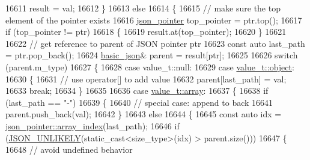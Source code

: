 \begin{DoxyCode}
16611                 result = val;
16612             \}
16613             \textcolor{keywordflow}{else}
16614             \{
16615                 \textcolor{comment}{// make sure the top element of the pointer exists}
16616                 \hyperlink{classnlohmann_1_1basic__json_a6886a5001f5b449ad316101a311ce536}{json\_pointer} top\_pointer = ptr.top();
16617                 \textcolor{keywordflow}{if} (top\_pointer != ptr)
16618                 \{
16619                     result.at(top\_pointer);
16620                 \}
16621 
16622                 \textcolor{comment}{// get reference to parent of JSON pointer ptr}
16623                 \textcolor{keyword}{const} \textcolor{keyword}{auto} last\_path = ptr.pop\_back();
16624                 \hyperlink{classnlohmann_1_1basic__json_aed115142bd0c6c66c864700e0467df55}{basic\_json}& parent = result[ptr];
16625 
16626                 \textcolor{keywordflow}{switch} (parent.m\_type)
16627                 \{
16628                     \textcolor{keywordflow}{case} value\_t::null:
16629                     \textcolor{keywordflow}{case} \hyperlink{namespacenlohmann_1_1detail_a1ed8fc6239da25abcaf681d30ace4985aa8cfde6331bd59eb2ac96f8911c4b666}{value\_t::object}:
16630                     \{
16631                         \textcolor{comment}{// use operator[] to add value}
16632                         parent[last\_path] = val;
16633                         \textcolor{keywordflow}{break};
16634                     \}
16635 
16636                     \textcolor{keywordflow}{case} \hyperlink{namespacenlohmann_1_1detail_a1ed8fc6239da25abcaf681d30ace4985af1f713c9e000f5d3f280adbd124df4f5}{value\_t::array}:
16637                     \{
16638                         \textcolor{keywordflow}{if} (last\_path == \textcolor{stringliteral}{"-"})
16639                         \{
16640                             \textcolor{comment}{// special case: append to back}
16641                             parent.push\_back(val);
16642                         \}
16643                         \textcolor{keywordflow}{else}
16644                         \{
16645                             \textcolor{keyword}{const} \textcolor{keyword}{auto} idx = \hyperlink{classnlohmann_1_1json__pointer_ac53f5b79dd91da78743c437832f57ce4}{json\_pointer::array\_index}(last\_path);
16646                             \textcolor{keywordflow}{if} (\hyperlink{json_8hpp_ab77582407c64944e7db1ea95ab520253}{JSON\_UNLIKELY}(static\_cast<size\_type>(idx) > parent.size()))
16647                             \{
16648                                 \textcolor{comment}{// avoid undefined behavior}

\end{DoxyCode}
